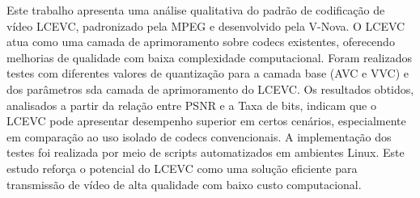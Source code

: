 Este trabalho apresenta uma análise qualitativa do padrão de codificação de vídeo \acrfull{LCEVC}, 
padronizado pela \acrfull{MPEG} e desenvolvido pela V-Nova. O \acrshort{LCEVC} atua como uma camada 
de aprimoramento sobre codecs existentes, oferecendo melhorias de qualidade com baixa complexidade 
computacional. Foram realizados testes com diferentes valores de quantização para a camada base 
(\acrfull{AVC} e \acrfull{VVC}) e dos parâmetros sda camada de aprimoramento do \acrshort{LCEVC}. 
Os resultados obtidos, analisados a partir da relação entre \acrfull{PSNR} e a Taxa de bits, indicam que o 
\acrshort{LCEVC} pode apresentar desempenho superior em certos cenários, especialmente em comparação 
ao uso isolado de codecs convencionais. A implementação dos testes foi realizada por meio de scripts
automatizados em ambientes Linux. Este estudo reforça o potencial do \acrshort{LCEVC} como uma solução 
eficiente para transmissão de vídeo de alta qualidade com baixo custo computacional.

